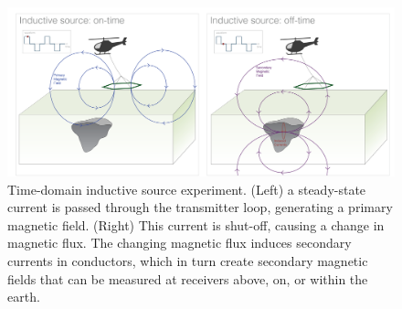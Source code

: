 \begin{figure}
    \begin{center}
    \includegraphics[width=\textwidth]{figures/intro/inductive-sources.png}
    \end{center}
\caption{
    Time-domain inductive source experiment. (Left) a steady-state current is passed through the transmitter loop, generating a primary magnetic field. (Right) This current is shut-off, causing a change in magnetic flux. The changing magnetic flux induces secondary currents in conductors, which in turn create secondary magnetic fields that can be measured at receivers above, on, or within the earth.
}
\label{fig:inductive-sources}
\end{figure}
